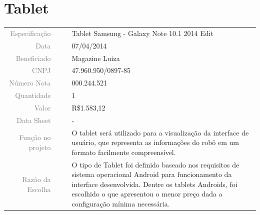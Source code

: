 

\section{Tablet}
\label{tablet}


\begin{table}[ht!]

	\begin{tabular}{r l|l p{12cm} }
		
		\textcolor{gray}{Especificação} &&& 	{Tablet Samsung - Galaxy Note 10.1 2014
		Edit }\\
		\textcolor{gray}{Data} &&& 				{07/04/2014}\\
        \textcolor{gray}{Beneficiado} &&&		{Magazine Luiza} \\
        \textcolor{gray}{CNPJ} &&& 				{47.960.950/0897-85} \\
        \textcolor{gray}{Número Nota} &&& 		{000.244.521} \\
		\textcolor{gray}{Quantidade} &&& 		{1} \\
		\textcolor{gray}{Valor} &&& 			{R\$1.583,12} \\
		\textcolor{gray}{Data Sheet} &&& 		{-} \\

		\textcolor{gray}{Função no projeto} &&& {O tablet será utilizado para a visualização da interface de usuário, que representa as informações do robô em um formato facilmente compreensível.} \\
		\textcolor{gray}{Razão da Escolha} &&& {O tipo de Tablet foi definido baseado nos requisitos de sistema operacional Android para funcionamento da interface desenvolvida. Dentre os tablets Androids, foi escolhido o que apresentou o menor preço dada a configuração mínima necessária.}
		

	\end{tabular}
\end{table}

\newpage
